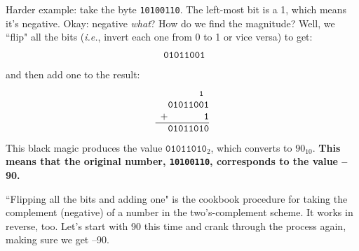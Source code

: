 Harder example: take the byte \texttt{10100110}. The left-most bit is a 1,
which means it's negative. Okay: negative \textit{what}? How do we find the
magnitude? Well, we ``flip" all the bits (\textit{i.e.}, invert each one
from 0 to 1 or vice versa) to get:
\[
\begin{array}{*{8}{c@{\hspace{0pt}}}}
 \texttt{0} & \texttt{1} & \texttt{0} & \texttt{1} & \texttt{1} & \texttt{0} & \texttt{0} & \texttt{1} \\
\end{array}
\]
and then add one to the result:
\[
\begin{array}{*{9}{c@{\hspace{0pt}}}}
&  & & & & & & \texttt{{\footnotesize 1}} & \\
 & \texttt{0}  & \texttt{1} & \texttt{0} & \texttt{1} & \texttt{1} & \texttt{0} & \texttt{0} & \texttt{1} \\
 + & & \texttt{ } & \texttt{ } & \texttt{ } & \texttt{ } & \texttt{ } & \texttt{ } & \texttt{1} \\
\hline
 & \texttt{0} &  \texttt{1} & \texttt{0} & \texttt{1} & \texttt{1} & \texttt{0} & \texttt{1} & \texttt{0} \\
\end{array}
\]
This black magic produces the value $\texttt{01011010}_2$, which converts to
$90_{10}$. \textbf{This means that the original number, \texttt{10100110}, corresponds to the
value --90.}

``Flipping all the bits and adding one" is the cookbook procedure for
taking the complement (negative) of a number in the two's-complement
scheme. It works in reverse, too. Let's start with 90 this time and crank through
the process again, making sure we get --90.

